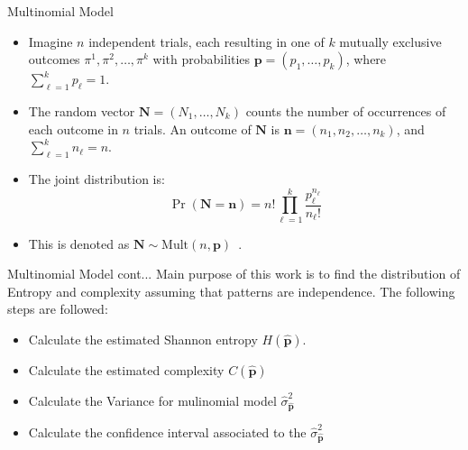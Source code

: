 \documentclass{beamer}
\begin{document}
\begin{frame}{Multinomial Model}
	\begin{itemize}
		\item Imagine $n$ independent trials, each resulting in one of $k$ mutually exclusive outcomes $\pi^1, \pi^2, \ldots, \pi^k$ with probabilities $\mathbf{p} = (p_1, \ldots, p_k)$, where $\sum_{\ell=1}^{k} p_\ell = 1$.
		\item The random vector $\mathbf{N} = (N_1, \ldots, N_k)$ counts the number of occurrences of each outcome in $n$ trials.
		An outcome of $\mathbf N$ is $\mathbf n=(n_1,n_2,\dots, n_k)$, and $\sum_{\ell=1}^{k} n_\ell = n$.
		\item The joint distribution is:
		\[
		\Pr(\mathbf{N} = \mathbf{n}) = n! \prod_{\ell=1}^{k} \frac{p_\ell^{n_\ell}}{n_\ell!}
		\]
		\item This is denoted as $\mathbf{N} \sim \text{Mult}(n, \mathbf{p})$~\cite{Rey2023}.
	\end{itemize}
\end{frame}


\begin{frame}{Multinomial Model cont...}
Main purpose of this work is to find the distribution of Entropy and complexity assuming that patterns are independence. The following steps are followed:
		\begin{itemize}
		\item Calculate the estimated Shannon entropy $H(\widehat{\mathbf{p}})$.
		\item Calculate the estimated complexity $C(\widehat{\bm{p}})$ 
		\item Calculate the Variance for mulinomial model $\widehat{\sigma}^2_{\widehat{\mathbf{p}}}$  
		\item Calculate the confidence interval associated to the $\widehat{\sigma}^2_{\widehat{\mathbf{p}}}$  
	
	\end{itemize}
\end{frame}
\end{document}
